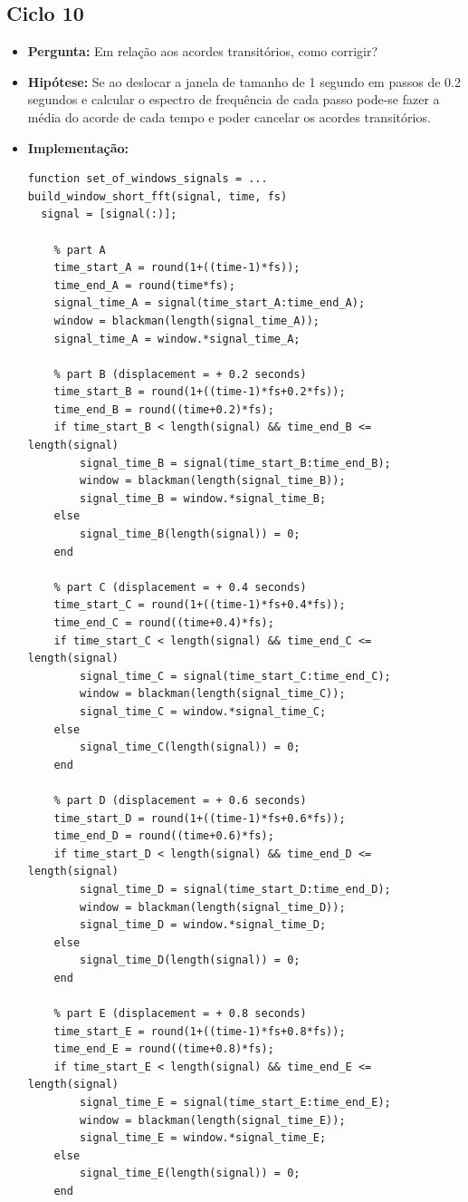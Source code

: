 \subsection{Ciclo 10}
\label{subsec:ciclo_10}
\begin{itemize}
\item \textbf{Pergunta:} Em relação aos acordes transitórios, como corrigir?
\item \textbf{Hipótese:} Se ao deslocar a janela de tamanho de 1 segundo em passos de 0.2 segundos e calcular o espectro de frequência de cada passo pode-se fazer a média do acorde de cada tempo e poder cancelar os acordes transitórios.
\item \textbf{Implementação:}
\begin{lstlisting}
function set_of_windows_signals = ...
build_window_short_fft(signal, time, fs)
  signal = [signal(:)];

    % part A
    time_start_A = round(1+((time-1)*fs));
    time_end_A = round(time*fs);
    signal_time_A = signal(time_start_A:time_end_A);
    window = blackman(length(signal_time_A));
    signal_time_A = window.*signal_time_A;

    % part B (displacement = + 0.2 seconds)
    time_start_B = round(1+((time-1)*fs+0.2*fs));
    time_end_B = round((time+0.2)*fs);
    if time_start_B < length(signal) && time_end_B <= length(signal)
        signal_time_B = signal(time_start_B:time_end_B);
        window = blackman(length(signal_time_B));
        signal_time_B = window.*signal_time_B;
    else
        signal_time_B(length(signal)) = 0;
    end

    % part C (displacement = + 0.4 seconds)
    time_start_C = round(1+((time-1)*fs+0.4*fs));
    time_end_C = round((time+0.4)*fs);
    if time_start_C < length(signal) && time_end_C <= length(signal)
        signal_time_C = signal(time_start_C:time_end_C);
        window = blackman(length(signal_time_C));
        signal_time_C = window.*signal_time_C;
    else
        signal_time_C(length(signal)) = 0;
    end

    % part D (displacement = + 0.6 seconds)
    time_start_D = round(1+((time-1)*fs+0.6*fs));
    time_end_D = round((time+0.6)*fs);
    if time_start_D < length(signal) && time_end_D <= length(signal)
        signal_time_D = signal(time_start_D:time_end_D);
        window = blackman(length(signal_time_D));
        signal_time_D = window.*signal_time_D;
    else
        signal_time_D(length(signal)) = 0;
    end

    % part E (displacement = + 0.8 seconds)
    time_start_E = round(1+((time-1)*fs+0.8*fs));
    time_end_E = round((time+0.8)*fs);
    if time_start_E < length(signal) && time_end_E <= length(signal)
        signal_time_E = signal(time_start_E:time_end_E);
        window = blackman(length(signal_time_E));
        signal_time_E = window.*signal_time_E;
    else
        signal_time_E(length(signal)) = 0;
    end


\end{lstlisting}
\end{itemize}
